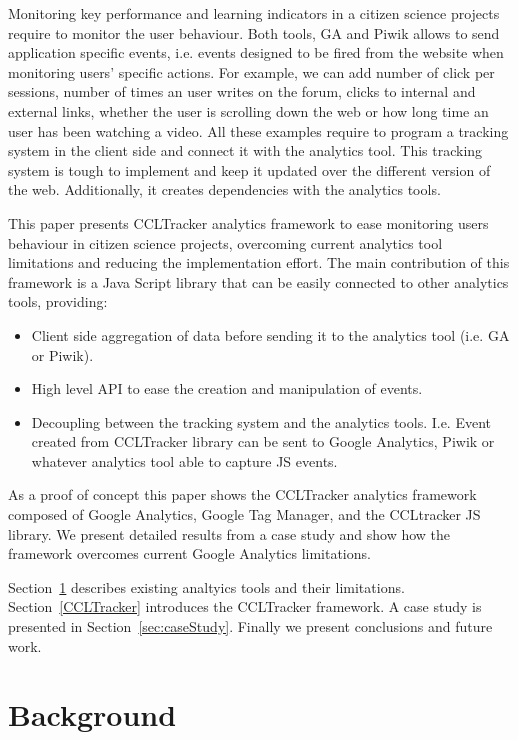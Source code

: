 \documentclass{article}
\begin{document}
Monitoring key performance and learning indicators in a citizen science projects require to monitor the user behaviour.  Both tools, GA and Piwik allows to send application specific events, i.e. events designed to be fired from the website when monitoring users' specific actions. For example, we can add number of click per sessions, number of times an user writes on the forum, clicks to internal and external links, whether the user is scrolling down the web or how long time an user has been watching a video. All these examples require to program a tracking system in the client side and connect it with the analytics tool. This tracking system is tough to implement and keep it updated over the different version of the web. Additionally, it creates dependencies with the analytics tools.

This paper presents CCLTracker analytics framework to ease monitoring users behaviour in citizen science projects, overcoming current analytics tool limitations and reducing the implementation effort. The main contribution of this framework is a Java Script library that can be easily connected to other analytics tools, providing:

\begin{itemize}
\item Client side aggregation of data before sending it to the analytics tool (i.e. GA or Piwik). 
\item High level API to ease the creation and manipulation of events. 
\item Decoupling between the tracking system and the analytics tools. I.e. Event created from CCLTracker library can be sent to Google Analytics, Piwik or whatever analytics tool able to capture JS events. 
\end{itemize}


As a proof of concept this paper shows the CCLTracker analytics framework composed of Google Analytics, Google Tag Manager, and the CCLtracker JS library. We present detailed results from a case study and show how the framework overcomes current Google Analytics limitations. 
 
Section~\ref{sec:related} describes existing analtyics tools and their limitations. Section~\ref{CCLTracker} introduces the CCLTracker framework. A case study is presented in Section~\ref{sec:caseStudy}. Finally we present conclusions and future work. 
 

\section{Background}\label{sec:related}
\end{document}

